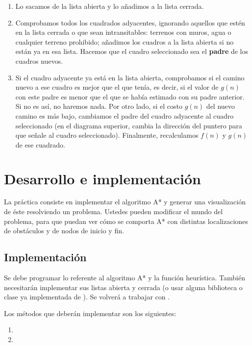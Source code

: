 \begin{enumerate}
  \item Lo sacamos de la lista abierta y lo añadimos a la lista cerrada.  

  \item Comprobamos todos los cuadrados adyacentes, ignorando aquellos que estén en la lista cerrada o que sean intransitables: terrenos con muros, agua o cualquier terreno prohibido; añadimos los cuadros a la lista abierta si no están ya en esa lista. Hacemos que el cuadro seleccionado sea el \textbf{padre} de los cuadros nuevos.

  \item Si el cuadro adyacente ya está en la lista abierta, comprobamos si el camino nuevo a ese cuadro es mejor que el que tenía, es decir, si el valor de \(g(n)\) con este padre es menor que el que se había estimado con su padre anterior. Si no es así, no haremos nada. Por otro lado, si el costo \(g(n)\) del nuevo camino es más bajo, cambiamos el padre del cuadro adyacente al cuadro seleccionado (en el diagrama superior, cambia la dirección del puntero para que señale al cuadro seleccionado). Finalmente, recalculamos \(f(n)\) y \(g(n)\) de ese cuadrado.
\end{enumerate}


\section{Desarrollo e implementaci\'on}

La práctica consiste en implementar el algoritmo A* y generar una visualización de éste resolviendo un problema. Ustedes pueden modificar el mundo del problema, para que puedan ver cómo se comporta A* con distintas localizaciones de obstáculos y de nodos de inicio y fin. 


\subsection{Implementaci\'on}


Se debe programar lo referente al algoritmo A* y la función heurística.
También necesitarán implementar sus listas abierta y cerrada (o usar alguna biblioteca o clase ya implementada de ).
Se volverá a trabajar con .

\noindent Los métodos que deberán implementar son los siguientes:

\begin{enumerate}
  \item {}
  \item {}
\end{enumerate}

